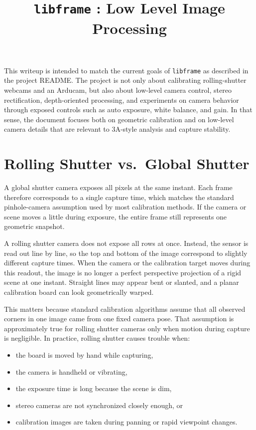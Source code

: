 \documentclass[11pt]{article}
\title{
\texttt{libframe} : Low Level Image Processing
}
\author{}
\date{}
\begin{document}
\maketitle

This writeup is intended to match the current goals of \texttt{libframe} as
described in the project README. The project is not only about calibrating
rolling-shutter webcams and an Arducam, but also about low-level camera
control, stereo rectification, depth-oriented processing, and experiments on
camera behavior through exposed controls such as auto exposure, white
balance, and gain. In that sense, the document focuses both on geometric
calibration and on low-level camera details that are relevant to 3A-style
analysis and capture stability.

\section{Rolling Shutter vs.\ Global Shutter}

A global shutter camera exposes all pixels at the same instant. Each frame
therefore corresponds to a single capture time, which matches the standard
pinhole-camera assumption used by most calibration methods. If the camera or
scene moves a little during exposure, the entire frame still represents one
geometric snapshot.

A rolling shutter camera does not expose all rows at once. Instead, the
sensor is read out line by line, so the top and bottom of the image
correspond to slightly different capture times. When the camera or the
calibration target moves during this readout, the image is no longer a
perfect perspective projection of a rigid scene at one instant. Straight
lines may appear bent or slanted, and a planar calibration board can look
geometrically warped.

This matters because standard calibration algorithms assume that all observed
corners in one image came from one fixed camera pose. That assumption is
approximately true for rolling shutter cameras only when motion during
capture is negligible. In practice, rolling shutter causes trouble when:

\begin{itemize}
\item the board is moved by hand while capturing,
\item the camera is handheld or vibrating,
\item the exposure time is long because the scene is dim,
\item stereo cameras are not synchronized closely enough, or
\item calibration images are taken during panning or rapid viewpoint changes.
\end{itemize}
\end{document}
